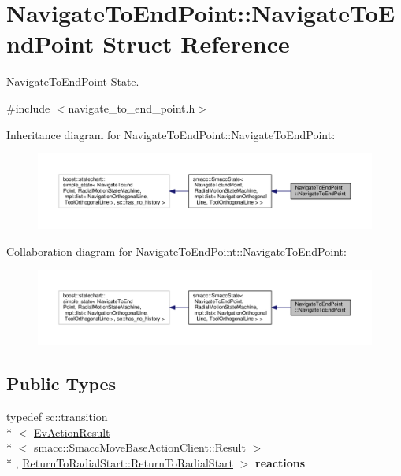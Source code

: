 \hypertarget{structNavigateToEndPoint_1_1NavigateToEndPoint}{\section{Navigate\-To\-End\-Point\-:\-:Navigate\-To\-End\-Point Struct Reference}
\label{structNavigateToEndPoint_1_1NavigateToEndPoint}
}


\hyperlink{structNavigateToEndPoint_1_1NavigateToEndPoint}{Navigate\-To\-End\-Point} State.  




{\ttfamily \#include $<$navigate\-\_\-to\-\_\-end\-\_\-point.\-h$>$}



Inheritance diagram for Navigate\-To\-End\-Point\-:\-:Navigate\-To\-End\-Point\-:
\nopagebreak
\begin{figure}[H]
\begin{center}
\leavevmode
\includegraphics[width=350pt]{structNavigateToEndPoint_1_1NavigateToEndPoint__inherit__graph}
\end{center}
\end{figure}


Collaboration diagram for Navigate\-To\-End\-Point\-:\-:Navigate\-To\-End\-Point\-:
\nopagebreak
\begin{figure}[H]
\begin{center}
\leavevmode
\includegraphics[width=350pt]{structNavigateToEndPoint_1_1NavigateToEndPoint__coll__graph}
\end{center}
\end{figure}
\subsection*{Public Types}
\begin{DoxyCompactItemize}
\item 
\hypertarget{structNavigateToEndPoint_1_1NavigateToEndPoint_abc30168c31735908f4b06db0b2742762}{typedef sc\-::transition\\*
$<$ \hyperlink{structsmacc_1_1EvActionResult}{Ev\-Action\-Result}\\*
$<$ smacc\-::\-Smacc\-Move\-Base\-Action\-Client\-::\-Result $>$\\*
, \hyperlink{structReturnToRadialStart_1_1ReturnToRadialStart}{Return\-To\-Radial\-Start\-::\-Return\-To\-Radial\-Start} $>$ {\bfseries reactions}}\label{structNavigateToEndPoint_1_1NavigateToEndPoint_abc30168c31735908f4b06db0b2742762}

\end{DoxyCompactItemize}
